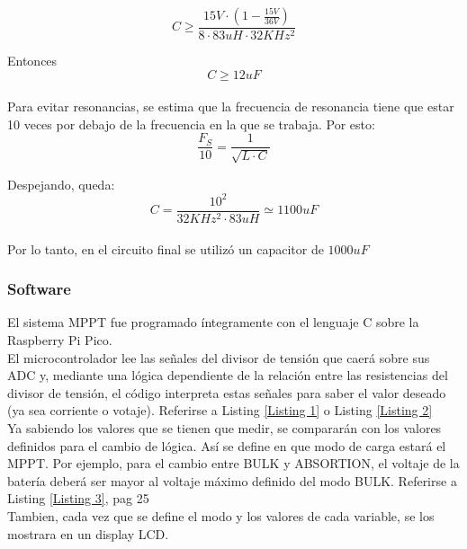 \begin{equation}
    C \geq \frac{15V \cdot (1 - \frac{15V}{36V})}{8 \cdot 83uH \cdot 32KHz^2}
\end{equation}

Entonces \[C \geq 12uF\]\\

Para evitar resonancias, se estima que la frecuencia de resonancia tiene que estar 10 veces por debajo de la frecuencia en la que se trabaja. Por esto:\\

\begin{equation}
    \frac{F_S}{10} = \frac{1}{\sqrt{L \cdot C}}
\end{equation}

Despejando, queda:\\

\begin{equation}
    C = \frac{10^2}{32KHz^2 \cdot 83uH} \simeq 1100uF
\end{equation}\\

Por lo tanto, en el circuito final se utilizó un capacitor de \textbf{$1000uF$}

\subsubsection{Software}

El sistema MPPT fue programado íntegramente con el lenguaje C sobre la Raspberry Pi Pico. \\

El microcontrolador lee las señales del divisor de tensión que caerá sobre sus ADC y, mediante una lógica dependiente de la relación entre las resistencias del divisor de tensión, el código interpreta estas señales para saber el valor deseado (ya sea corriente o votaje). Referirse a Listing \ref{Listing 1}  o Listing \ref{Listing 2}\\

Ya sabiendo los valores que se tienen que medir, se compararán con los valores definidos para el cambio de lógica. Así se define en que modo de carga estará el MPPT. Por ejemplo, para el cambio entre BULK y ABSORTION, el voltaje de la batería deberá ser mayor al voltaje máximo definido del modo BULK. Referirse a Listing \ref{Listing 3}, pag 25\\

Tambien, cada vez que se define el modo y los valores de cada variable, se los mostrara en un display LCD. \\

